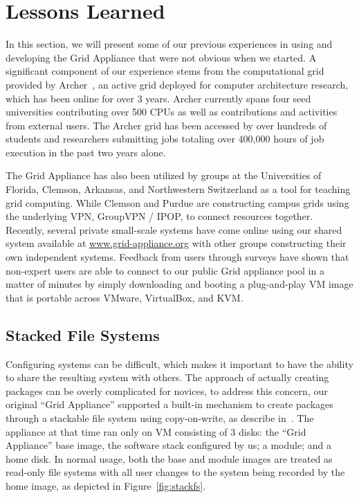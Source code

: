 \documentclass[conference]{IEEEtran}
\begin{document}
\section{Lessons Learned}
\label{lessons_learned}

In this section, we will present some of our previous experiences in using and
developing the Grid Appliance that were not obvious when we started.  A
significant component of our experience stems from the computational grid
provided by Archer~\cite{archer}, an active grid deployed for computer
architecture research, which has been online for over 3 years.  Archer
currently spans four seed universities contributing over 500 CPUs as well as
contributions and activities from external users.  The Archer grid has been
accessed by over hundreds of students and researchers submitting jobs totaling
over 400,000 hours of job execution in the past two years alone.

The Grid Appliance has also been utilized by groups at the Universities of
Florida, Clemson, Arkansas, and Northwestern Switzerland as a tool for teaching
grid computing.  While Clemson and Purdue are constructing campus grids using
the underlying VPN, GroupVPN / IPOP, to connect resources together.  Recently,
several private small-scale systems have come online using our shared system
available at \url{www.grid-appliance.org} with other groups constructing their
own independent systems.  Feedback from users through surveys have shown that
non-expert users are able to connect to our public Grid appliance pool in a
matter of minutes by simply downloading and booting a plug-and-play VM image
that is portable across VMware, VirtualBox, and KVM.

\subsection{Stacked File Systems}

Configuring systems can be difficult, which makes it important to have the
ability to share the resulting system with others.  The approach of actually
creating packages can be overly complicated for novices, to address this
concern, our original ``Grid Appliance'' supported a built-in mechanism to
create packages through a stackable file system using copy-on-write, as
describe in~\cite{vtdc}.  The appliance at that time ran only on VM consisting
of 3 disks: the ``Grid Appliance'' base image, the software stack configured by
us; a module; and a home disk.  In normal usage, both the base and module
images are treated as read-only file systems with all user changes to the
system being recorded by the home image, as depicted in
Figure~\ref{fig:stackfs}.
\end{document}
